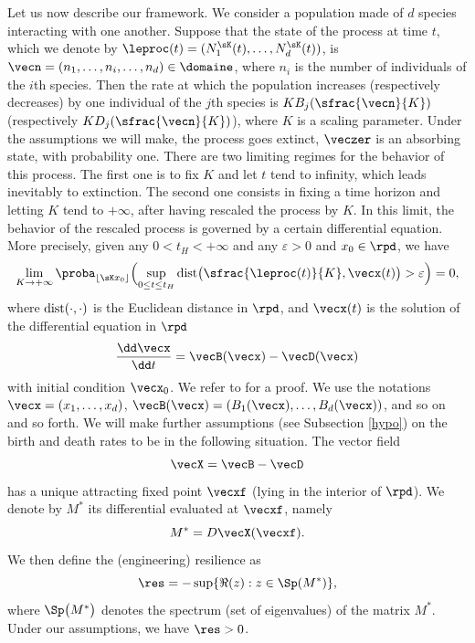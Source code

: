 Let us now describe our framework. We consider a population made of $d$ species interacting with one another. Suppose that the state of the
process at time $t$, which we denote by $\leproc(t)=(N_1^{\sK}(t), \ldots,N_d^{\sK}(t))$, is $\vecn=(n_1,
\ldots,n_i,\ldots,n_d) \in\domaine$, where $n_i$ is the number of individuals of the $i$th species. Then the rate at which the population increases
(respectively decreases) by one individual of the $j$th species is $KB_j(\sfrac{\vecn}{K})$ (respectively $K
D_j(\sfrac{\vecn}{K})$), where $K$ is a scaling parameter.
Under the assumptions we will make, the process goes extinct, \ie $\veczer$ is an absorbing state, with probability one.
There are two limiting regimes for the behavior of this process.
The first one is to fix $K$ and let $t$ tend to infinity, which leads inevitably to extinction.
The second one consists in fixing a time horizon and letting $K$ tend to $+\infty$, after having rescaled the process
by $K$. In this limit, the behavior of the rescaled process is governed by a certain differential equation.
More precisely, given any $0<t_H<+\infty$ and any $\varepsilon>0$ and $x_{0}\in \rpd$, we have
\[
\lim_{K\to+\infty} \proba_{\lfloor \sK x_{0}\rfloor}
\Bigl(\sup_{0\leq t\leq t_H}\textup{dist}\bigl(\sfrac{\leproc(t)}{K},\vecx(t)\bigr)>\varepsilon \Bigr)=0,
\]
where $\textup{dist}(\cdot,\cdot)$ is the Euclidean distance in $\rpd$, and $\vecx(t)$ is the solution of the differential equation in $\rpd$
\[
\frac{\dd\vecx}{\dd t}=\vecB(\vecx)-\vecD(\vecx)
\]
with initial condition $\vecx_0$. We refer to \cite[Chap.\,11]{EK} for a proof.
We use the notations $\vecx=(x_1,\ldots,x_d)$, $\vecB(\vecx)=(B_1(\vecx),\ldots,B_d(\vecx))$,
and so on and so forth. We will make further assumptions (see Subsection \ref{hypo}) on the birth and death rates to be in the following
situation.
The vector field
\[
\vecX=\vecB-\vecD
\]
has a unique attracting fixed point $\vecxf$ (lying in the interior of $\rpd$). We denote by $M^*$ its differential evaluated at
$\vecxf$, namely
\[
M^*=D\vecX(\vecxf).
\]
We then define the (engineering) resilience as
\[
\res= - \sup\{ \Re (z): z\in\Sp(M^*)\},
\]
where $\Sp\bigl(M^*\bigr)$ denotes the spectrum (set of eigenvalues) of the matrix $M^*$.
Under our assumptions, we have $\res>0$.

